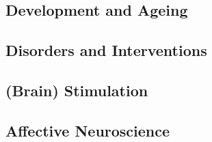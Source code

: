 \subsection*{Development and Ageing}

% 
% 
% 
% 
% 
% 
% 

\subsection*{Disorders and Interventions}

% 
% 
% 
% 
% 
% 
% 
% 
% 
% 
% 
% 
% 
% 
% 
% 
% 
% 

\subsection*{(Brain) Stimulation}

% 
% 
% 
% 
% 
% 

\subsection*{Affective Neuroscience}

% 
% 
% 
% 
% 
% 
% 
% 
% 
% 
% 
% 
% 
% 
% 
\newpage